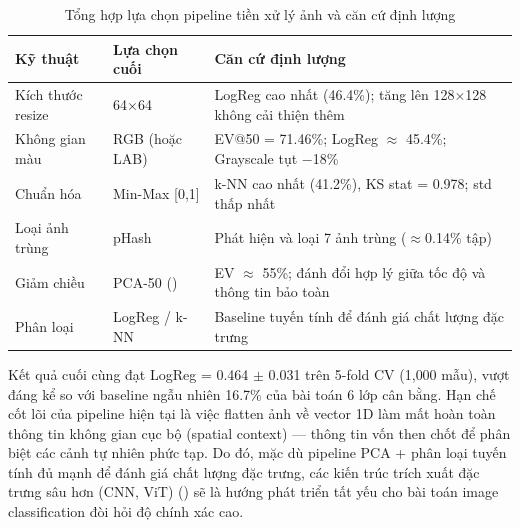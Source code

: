 \begin{table}[H]
    \centering
    \small
    \begin{tabular}{|p{2.8cm}|p{3.5cm}|p{7cm}|}
        \hline
        \textbf{Kỹ thuật} & \textbf{Lựa chọn cuối}          & \textbf{Căn cứ định lượng}                                             \\
        \hline
        Kích thước resize & 64$\times$64                    & LogReg cao nhất (46.4\%); tăng lên 128$\times$128 không cải thiện thêm \\
        \hline
        Không gian màu    & RGB (hoặc LAB)                  & EV@50 = 71.46\%; LogReg $\approx$ 45.4\%; Grayscale tụt $-$18\%        \\
        \hline
        Chuẩn hóa         & Min-Max [0,1]                   & k-NN cao nhất (41.2\%), KS stat = 0.978; std thấp nhất                 \\
        \hline
        Loại ảnh trùng    & pHash                            & Phát hiện và loại 7 ảnh trùng ($\approx$0.14\% tập)                    \\
        \hline
        Giảm chiều        & PCA-50 (\cite{jolliffe2002pca}) & EV $\approx$ 55\%; đánh đổi hợp lý giữa tốc độ và thông tin bảo toàn   \\
        \hline
        Phân loại         & LogReg / k-NN                   & Baseline tuyến tính để đánh giá chất lượng đặc trưng                   \\
        \hline
    \end{tabular}
    \caption{Tổng hợp lựa chọn pipeline tiền xử lý ảnh và căn cứ định lượng}
    \label{tab:pipeline_conclusion}
\end{table}

Kết quả cuối cùng đạt LogReg = 0.464 $\pm$ 0.031 trên 5-fold CV (1{,}000 mẫu), vượt đáng kể so với baseline ngẫu nhiên 16.7\% của bài toán 6 lớp cân bằng. Hạn chế cốt lõi của pipeline hiện tại là việc flatten ảnh về vector 1D làm mất hoàn toàn thông tin không gian cục bộ (spatial context) --- thông tin vốn then chốt để phân biệt các cảnh tự nhiên phức tạp. Do đó, mặc dù pipeline PCA + phân loại tuyến tính đủ mạnh để đánh giá chất lượng đặc trưng, các kiến trúc trích xuất đặc trưng sâu hơn (CNN, ViT) (\cite{dosovitskiy2021vit}) sẽ là hướng phát triển tất yếu cho bài toán image classification đòi hỏi độ chính xác cao.
